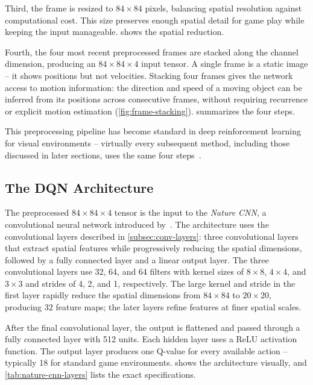 

\smallskip
Third, the frame is resized to $84 \times 84$ pixels, balancing
spatial resolution against computational cost. This size preserves
enough spatial detail for game play while keeping the input
manageable.  shows the spatial reduction.



\smallskip
Fourth, the four most recent preprocessed frames are stacked along
the channel dimension, producing an $84 \times 84 \times 4$ input
tensor. A single frame is a static image -- it shows positions but
not velocities. Stacking four frames gives the network access to
motion information: the direction and speed of a moving object can
be inferred from its positions across consecutive frames, without
requiring recurrence or explicit motion estimation
(\cref{fig:frame-stacking}).
 summarizes the four steps.





\smallskip
This preprocessing pipeline has become standard in deep reinforcement
learning for visual environments -- virtually every subsequent
method, including those discussed in later sections, uses the same
four steps~\citep{mnih2015human}.

\subsection{The DQN Architecture}
\label{subsec:dqn-architecture}

The preprocessed $84 \times 84 \times 4$ tensor is the input to
the \emph{Nature CNN}, a convolutional neural network introduced
by~\citet{mnih2015human}. The architecture uses the convolutional
layers described in \cref{subsec:conv-layers}: three convolutional
layers that extract spatial features while progressively reducing
the spatial dimensions, followed by a fully connected layer and a
linear output layer. The three convolutional layers use 32, 64,
and 64 filters with kernel sizes of $8 \times 8$, $4 \times 4$,
and $3 \times 3$ and strides of 4, 2, and 1, respectively. The
large kernel and stride in the first layer rapidly reduce the
spatial dimensions from $84 \times 84$ to $20 \times 20$, producing
$32$ feature maps; the later layers refine features at finer spatial
scales.

\smallskip After the final convolutional
layer, the output is flattened and passed through a fully connected
layer with 512 units. Each hidden layer uses a ReLU activation
function. The output layer produces one Q-value for every available
action -- typically 18 for standard game environments.
 shows the architecture visually, and
\cref{tab:nature-cnn-layers} lists the exact specifications.

